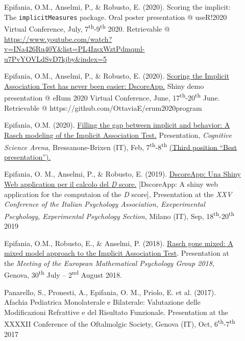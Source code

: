 \documentclass[letterpaper,12pt]{article}
\begin{document}
\begin{description}
	\item[] 	Epifania, O.M., Anselmi, P., \& Robusto, E. (2020). Scoring the implicit: The \texttt{implicitMeasures} package. Oral poster presentation @ useR!2020 Virtual Conference, July, 7\textsuperscript{th}-9\textsuperscript{th}  2020.  Retrievable @ \href{https://www.youtube.com/watch?v=INa426Ru40Y&list=PL4IzsxWztPdmqml-u7PvYOVLdSvD7kjby&index=5}{https://www.youtube.com/watch?v=INa426Ru40Y\&list=PL4IzsxWztPdmqml-u7PvYOVLdSvD7kjby\&index=5}
	
	\item[] 	Epifania, O.M., Anselmi, P., \& Robusto, E. (2020). \href{https://github.com/OttaviaE/eRum2020/blob/master/eRumShinyDemo-Epifania.Rmd}{Scoring the Implicit Association Test has never been easier: DscoreApp.} Shiny demo presentation @ eRum 2020 Virtual Conference, June, 17\textsuperscript{th}-20\textsuperscript{th} June. Retrievable @ https://github.com/OttaviaE/erum2020program
	
	\item[]  Epifania, O.M. (2020). \href{https://ottaviae.github.io/presentations/2020/brixen.pdf}{Filling the gap between implicit and behavior: A Rasch modeling of the Implicit Association Test.} Presentation, \emph{Cognitive Science Arena}, Bressanone-Brixen (IT), Feb, 7\textsuperscript{th}-8\textsuperscript{th} \underline{(Third position ``Best presentation'').}
	
	\item[] 	Epifania, O. M., Anselmi, P., \& Robusto, E. (2019). \href{https://ottaviae.github.io/presentations/2019/aip_slides.html#1}{DscoreApp: Una Shiny Web application per il calcolo del \emph{D} score.}  [DscoreApp: A shiny web application for the computaion of the \emph{D} score], Presentation at the \emph{XXV Conference of the Italian Psychology Association, Exeperimental Pscyhology, Experimental Psychology Section}, Milano (IT), Sep, 18\textsuperscript{th}-20\textsuperscript{th} 2019
	
	\item[] 	Epifania, O.M., Robusto, E., \& Anselmi, P. (2018). \href{https://ottaviae.github.io/presentations/2018/empg2018.pdf}{Rasch gone mixed: A mixed model approach to the Implicit Association Test}. Presentation at the \emph{Meeting of the European Mathematical Psychology Group 2018}, Genova, 30\textsuperscript{th} July – 2\textsuperscript{nd} August 2018.
	
	\item[] 	Panarello, S., Pronesti, A., Epifania, O. M., Priolo, E. et al. (2017). Afachia Pediatrica Monolaterale e Bilaterale: Valutazione delle Modificazioni Refrattive e del Risultato Funzionale. Presentation at the XXXXII Conference of the Oftalmolgic Society, Genova (IT), Oct, 6\textsuperscript{th}-7\textsuperscript{th} 2017
	

\end{description}
\end{document}
